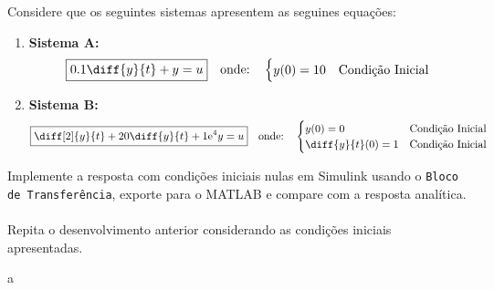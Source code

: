 \documentclass{article}
\begin{document}
            \begin{exercise}
                Considere que os seguintes sistemas apresentem as seguines equações:
                    \begin{enumerate}
                        \item \textbf{Sistema A:}
                            \begin{equation}
                                \boxed{
                                    0.1\diff{y}{t} + y = u
                                }
                                \quad
                                \text{onde:}
                                \quad
                                \begin{cases}
                                    y(0) = 10 & \text{Condição Inicial}\\
                                \end{cases}
                            \end{equation}
                        \item \textbf{Sistema B:}
                            \begin{equation}
                                \boxed{
                                    \diff[2]{y}{t} + 
                                    20\diff{y}{t} + 
                                    1\text{e}^{4} y = u
                                }
                                \quad
                                \text{onde:}
                                \quad
                                \begin{cases}
                                    y(0) = 0           & \text{Condição Inicial}\\
                                    \diff{y}{t}(0) = 1 & \text{Condição Inicial}\\
                                \end{cases}
                            \end{equation}
                    \end{enumerate}
                Implemente a resposta com condições iniciais nulas em Simulink usando o \texttt{Bloco de Transferência}, exporte para o MATLAB e compare com a resposta analítica.
                \\\\
                Repita o desenvolvimento anterior considerando as condições iniciais apresentadas.
            \end{exercise}
            \begin{resolution}
                a
            \end{resolution}
\end{document}

